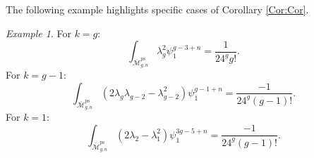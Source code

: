 \documentclass[leqno,12pt]{amsart}
\theoremstyle{remark}
\newtheorem{remark}[theorem]{Remark}
\newtheorem{example}[theorem]{Example}
\numberwithin{equation}{section}
\DeclareMathOperator{\ps}{ps}
\begin{document}

The following example highlights specific cases of Corollary \ref{Cor:Cor}.

\begin{example}\label{ex:MumfordHodge1} For $k = g:$ 
    $$
    \int_{\overline{\mathcal{M}}^{\ps}_{g, n}} \lambda_g^2\psi_1^{g-3+n} = \frac{1}{24^gg!}.
    $$
    For $k = g-1:$ 
    $$
    \int_{\overline{\mathcal{M}}^{\ps}_{g, n}} (2\lambda_g\lambda_{g-2} - \lambda_{g-2}^2)\psi_1^{g-1+n} = \frac{-1}{24^g(g-1)!}.
    $$
    For $k = 1:$
    $$
    \int_{\overline{\mathcal{M}}^{\ps}_{g, n}} (2\lambda_2 - \lambda_1^2)\psi_1^{3g-5+n} = \frac{-1}{24^g(g-1)!}.
    $$
\end{example}
\end{document}
